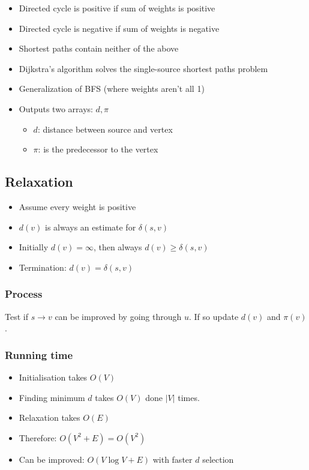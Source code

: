 \begin{itemize}
    \item Directed cycle is positive if sum of weights is positive
    \item Directed cycle is negative if sum of weights is negative
    \item Shortest paths contain neither of the above
    \item Dijkstra's algorithm solves the single-source shortest paths problem
    \item Generalization of BFS (where weights aren't all 1)
    \item Outputs two arrays: $d, \pi$
    \begin{itemize}
        \item $d$: distance between source and vertex
        \item $\pi$: is the predecessor to the vertex
    \end{itemize}
\end{itemize}

\subsection{Relaxation}
\begin{itemize}
    \item Assume every weight is positive
    \item $d(v)$ is always an estimate for $\delta(s,v)$
    \item Initially $d(v)=\infty$, then always $d(v)\geq \delta(s,v)$
    \item Termination: $d(v)=\delta(s,v)$
\end{itemize}

\subsubsection{Process}
Test if $s\rightarrow v$ can be improved by going through $u$. If so update $d(v)$ and $\pi(v)$.

\subsubsection{Running time}
\begin{itemize}
    \item Initialisation takes $O(V)$
    \item Finding minimum $d$ takes $O(V)$ done $|V|$ times.
    \item Relaxation takes $O(E)$
    \item Therefore: $O(V^2+E)=O(V^2)$
    \item Can be improved: $O(V\log{}V+E)$ with faster $d$ selection
\end{itemize}
